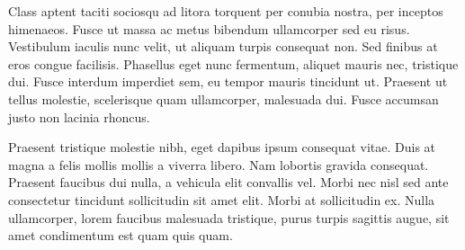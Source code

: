 \documentclass[a4paper,10pt,titlepage]{article}
\begin{document}
\null

Class aptent taciti sociosqu ad litora torquent per conubia nostra, per inceptos himenaeos. Fusce ut massa ac metus bibendum ullamcorper sed eu risus. Vestibulum iaculis nunc velit, ut aliquam turpis consequat non. Sed finibus at eros congue facilisis. Phasellus eget nunc fermentum, aliquet mauris nec, tristique dui. Fusce interdum imperdiet sem, eu tempor mauris tincidunt ut. Praesent ut tellus molestie, scelerisque quam ullamcorper, malesuada dui. Fusce accumsan justo non lacinia rhoncus.
\null

\null

Praesent tristique molestie nibh, eget dapibus ipsum consequat vitae. Duis at magna a felis mollis mollis a viverra libero. Nam lobortis gravida consequat. Praesent faucibus dui nulla, a vehicula elit convallis vel. Morbi nec nisl sed ante consectetur tincidunt sollicitudin sit amet elit. Morbi at sollicitudin ex. Nulla ullamcorper, lorem faucibus malesuada tristique, purus turpis sagittis augue, sit amet condimentum est quam quis quam. 

\newpage
\null\vspace{\fill}
\end{document}
